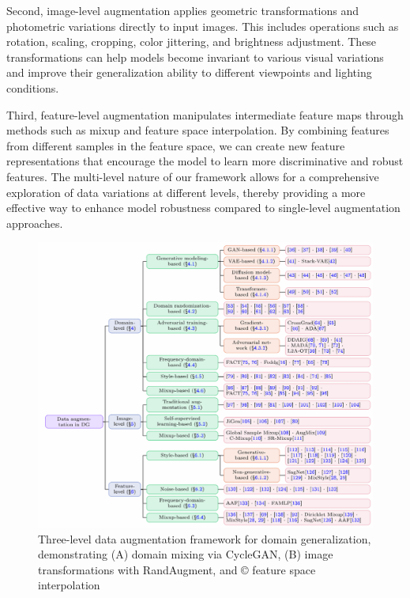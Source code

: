 \documentclass[manuscript,screen,review]{acmart}
\begin{document}
Second, image-level augmentation applies geometric transformations and photometric variations directly to input images. This includes operations such as rotation, scaling, cropping, color jittering, and brightness adjustment. These transformations can help models become invariant to various visual variations and improve their generalization ability to different viewpoints and lighting conditions.

Third, feature-level augmentation manipulates intermediate feature maps through methods such as mixup and feature space interpolation. By combining features from different samples in the feature space, we can create new feature representations that encourage the model to learn more discriminative and robust features. The multi-level nature of our framework allows for a comprehensive exploration of data variations at different levels, thereby providing a more effective way to enhance model robustness compared to single-level augmentation approaches.

\begin{figure}[htb]
\centering
\includegraphics[width=0.8\linewidth]{picture/2.1.png}
\caption{Three-level data augmentation framework for domain generalization, demonstrating (A) domain mixing via CycleGAN, (B) image transformations with RandAugment, and © feature space interpolation}
\label{fig:augmentation_framework}
\end{figure}
\end{document}
